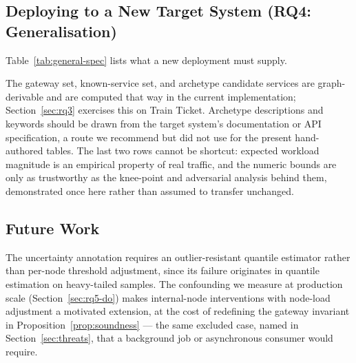 \documentclass[journal, 10pt]{IEEEtran}
\begin{document}
\subsection{Deploying to a New Target System (RQ4: Generalisation)}
\label{sec:general-spec}
Table~\ref{tab:general-spec} lists what a new deployment must supply.

\begin{table}[!t]
\centering
\caption{Inputs a new deployment must supply, and how much of each is automatable.}
\label{tab:general-spec}
\end{table}
The gateway set, known-service set, and archetype candidate services are
graph-derivable and are computed that way in the current implementation;
Section~\ref{sec:rq3} exercises this on Train Ticket. Archetype descriptions and
keywords should be drawn from the target system's documentation or API
specification, a route we recommend but did not use for the present hand-authored
tables. The last two rows cannot be shortcut: expected workload magnitude is an
empirical property of real traffic, and the numeric bounds are only as
trustworthy as the knee-point and adversarial analysis behind them, demonstrated
once here rather than assumed to transfer unchanged.


\subsection{Future Work}
\label{sec:future-work}
The uncertainty annotation requires an outlier-resistant quantile estimator
rather than per-node threshold adjustment, since its failure originates in
quantile estimation on heavy-tailed samples. The confounding we measure at
production scale (Section~\ref{sec:rq5-do}) makes internal-node interventions
with node-load adjustment a motivated extension, at the cost of redefining the
gateway invariant in Proposition~\ref{prop:soundness} --- the same excluded
case, named in Section~\ref{sec:threats}, that a background job or asynchronous
consumer would require.
\end{document}
